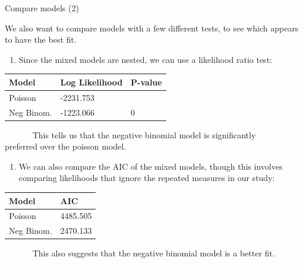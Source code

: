 \documentclass[ignorenonframetext,]{beamer}
\providecommand{\tightlist}{%
  \setlength{\itemsep}{0pt}\setlength{\parskip}{0pt}}
\begin{document}
\begin{frame}{Compare models (2)}

\small
We also want to compare models with a few different tests, to see which
appears to have the best fit.

\begin{enumerate}
\def\labelenumi{\arabic{enumi}.}
\tightlist
\item
  Since the mixed models are nested, we can use a likelihood ratio test:
\end{enumerate}

\tiny

\begin{longtable}[]{@{}lll@{}}
\toprule
Model & Log Likelihood & P-value\tabularnewline
\midrule
\endhead
Poisson & -2231.753 &\tabularnewline
Neg Binom. & -1223.066 & 0\tabularnewline
\bottomrule
\end{longtable}

\vspace{-10pt} \small
~~~~~~ This tells us that the negative binomial model is significantly\\
\hspace*{0.333em}\hspace*{0.333em}\hspace*{0.333em}\hspace*{0.333em}\hspace*{0.333em}\hspace*{0.333em}
preferred over the poisson model.

\begin{enumerate}
\def\labelenumi{\arabic{enumi}.}
\setcounter{enumi}{1}
\tightlist
\item
  We can also compare the AIC of the mixed models, though this involves
  comparing likelihoods that ignore the repeated measures in our study:
\end{enumerate}

\vspace{-12pt} \tiny

\begin{longtable}[]{@{}ll@{}}
\toprule
Model & AIC\tabularnewline
\midrule
\endhead
Poisson & 4485.505\tabularnewline
Neg Binom. & 2470.133\tabularnewline
\bottomrule
\end{longtable}

\vspace{-10pt} \small
~~~~~~ This also suggests that the negative binomial model is a better
fit.\\
\textcolor{white}{.}

\end{frame}
\end{document}
